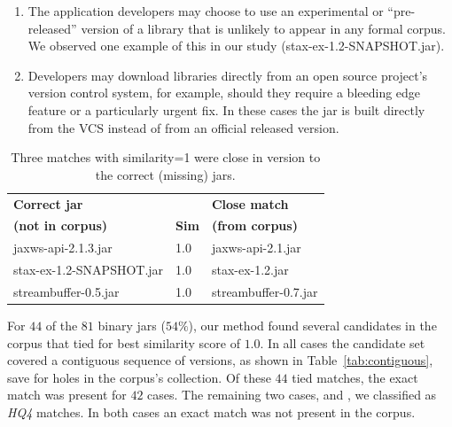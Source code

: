 \begin{enumerate}

    \item The application developers may choose to use an experimental or
    ``pre-released'' version of a library that is unlikely to appear in any
    formal corpus.  We observed one example of this in our study
    (stax-ex-1.2-SNAPSHOT.jar).

    \item Developers may download libraries directly from an open source
    project's version control system, for example, should they require a
    bleeding edge feature or a particularly urgent fix.  In these cases the
    jar is built directly from the VCS instead of from an official released
    version.

\end{enumerate}


\begin{table}[htbp]
    \centering
    \begin{tabular}{lll}
        \textbf{Correct jar}      &                & \textbf{Close match} \\
        \textbf{(not in corpus)}  & \textbf{Sim}  & \textbf{(from corpus)} \\
        \hline\hline
        jaxws-api-2.1.3.jar & 1.0 & jaxws-api-2.1.jar       \\
        stax-ex-1.2-SNAPSHOT.jar & 1.0 & stax-ex-1.2.jar         \\
        streambuffer-0.5.jar & 1.0 & streambuffer-0.7.jar    \\
        \hline
    \end{tabular}
    \vspace{1mm}
    \caption{Three matches with similarity=1 were close in version to the correct (missing) jars.}
    \label{tab:close}
\end{table}




For $44$ of the $81$ binary jars ($54\%$), our method found several
candidates in the corpus that tied for best similarity score of $1.0$.  In
all cases the candidate set covered a contiguous sequence of versions, as
shown in Table~\ref{tab:contiguous}, save for holes in the corpus's
collection.  Of these $44$ tied matches, the exact match was present for
$42$ cases.  The remaining two cases,  and
, we classified as \emph{HQ4}
matches.  In both cases an exact match was not present in the corpus.

